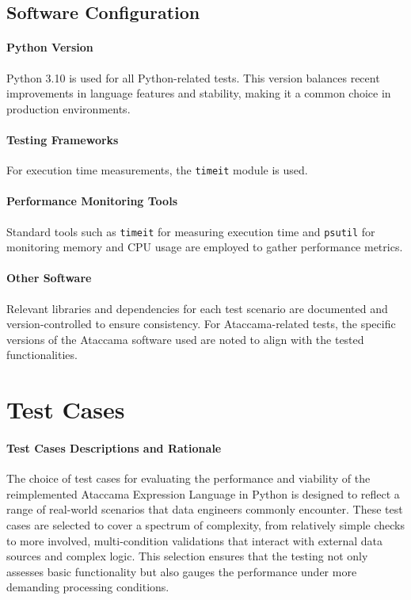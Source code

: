     \subsection{Software Configuration}

    \paragraph{Python Version} Python 3.10 is used for all Python-related tests. This version balances recent improvements in language features and stability, making it a common choice in production environments.
    
    \paragraph{Testing Frameworks} For execution time measurements, the \texttt{timeit} module is used.
    \paragraph{Performance Monitoring Tools} Standard tools such as \texttt{timeit} for measuring execution time and \texttt{psutil} for monitoring memory and CPU usage are employed to gather performance metrics.
    \paragraph{Other Software} Relevant libraries and dependencies for each test scenario are documented and version-controlled to ensure consistency. For Ataccama-related tests, the specific versions of the Ataccama software used are noted to align with the tested functionalities.

\section{Test Cases}


\paragraph{Test Cases Descriptions and Rationale}

The choice of test cases for evaluating the performance and viability of the reimplemented Ataccama Expression Language in Python is designed to reflect a range of real-world scenarios that data engineers commonly encounter. These test cases are selected to cover a spectrum of complexity, from relatively simple checks to more involved, multi-condition validations that interact with external data sources and complex logic. This selection ensures that the testing not only assesses basic functionality but also gauges the performance under more demanding processing conditions.

